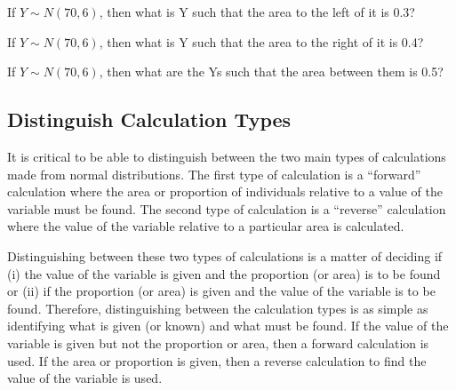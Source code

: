 \documentclass[10pt,openany]{book}\usepackage[]{graphicx}\usepackage[]{color}
\begin{document}
\begin{exsection}
  \item \label{revex:quNormXrev03} If $Y\sim N(70,6)$, then what is Y such that the area to the left of it is 0.3? 
  \item \label{revex:quNormXrev04} If $Y\sim N(70,6)$, then what is Y such that the area to the right of it is 0.4? 
  \item \label{revex:quNormXrev05} If $Y\sim N(70,6)$, then what are the Ys such that the area between them is 0.5? 
\end{exsection}


\subsection{Distinguish Calculation Types}
It is critical to be able to distinguish between the two main types of calculations made from normal distributions.  The first type of calculation is a ``forward'' calculation where the area or proportion of individuals relative to a value of the variable must be found.  The second type of calculation is a ``reverse'' calculation where the value of the variable relative to a particular area is calculated.

Distinguishing between these two types of calculations is a matter of deciding if (i) the value of the variable is given and the proportion (or area) is to be found or (ii) if the proportion (or area) is given and the value of the variable is to be found.  Therefore, distinguishing between the calculation types is as simple as identifying what is given (or known) and what must be found.  If the value of the variable is given but not the proportion or area, then a forward calculation is used.  If the area or proportion is given, then a reverse calculation to find the value of the variable is used.
\end{document}
